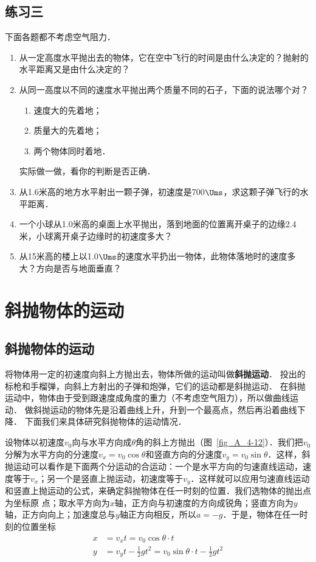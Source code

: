 \subsection*{练习三}


下面各题都不考虑空气阻力．
\begin{enumerate}
\item 从一定高度水平抛出去的物体，它在空中飞行的时间是由什么决定的？抛射的水平距离又是由什么决定的？
\item 从同一高度以不同的速度水平抛出两个质量不同的石子，下面的说法哪个对？
\begin{enumerate}
	\item 速度大的先着地；
	\item  质量大的先着地；
	\item 两个物体同时着地．
\end{enumerate}
实际做一做，看你的判断是否正确．

\item 从1.6米高的地方水平射出一颗子弹，初速度是700$\Ums$，求这颗子弹飞行的水平距离．
\item 一个小球从1.0米高的桌面上水平抛出，落到地面的位置离开桌子的边缘2.4米，小球离开桌子边缘时的初速度多大？
\item 从15米高的楼上以1.0$\Ums$的速度水平扔出一物体，此物体落地时的速度多大？方向是否与地面垂直？

\end{enumerate}


\section{斜抛物体的运动}
\subsection{斜抛物体的运动} 

将物体用一定的初速度向斜上方抛出去，物体所做的运动叫做\textbf{斜抛运动}．
投出的标枪和手榴弹，向斜上方射出的子弹和炮弹，它们的运动都是斜抛运动．
在斜抛运动中，物体由于受到跟速度成角度的重力（不考虑空气阻力），所以做曲线运动．
做斜抛运动的物体先是沿着曲线上升，升到一个最高点，然后再沿着曲线下降．
下面我们来具体研究斜抛物体的运动情况．

设物体以初速度$v_0$向与水平方向成$\theta$角的斜上方抛出（图~\ref{fig_A_4-12}）．我们把$v_0$分解为水平方向的分速度$v_x=v_0\cos\theta$和竖直方向的分速度$v_y=v_0\sin\theta$．这样，斜抛运动可以看作是下面两个分运动的合运动：一个是水平方向的匀速直线运动，速度等于$v_x$；另一个是竖直上抛运动，初速度等于$v_y$．这样就可以应用匀速直线运动和竖直上抛运动的公式，来确定斜抛物体在任一时刻的位置．我们选物体的抛出点为坐标原
点；取水平方向为$x$轴，正方向与初速度的方向成锐角；竖直方向为$y$轴，正方向向上；加速度总与$y$轴正方向相反，所以$a=-g$．于是，物体在任一时刻的位置坐标
\[\begin{split}
x&=v_x t=v_0\cos\theta \cdot t\\
y&=v_y t-\frac{1}{2}gt^2=v_0\sin\theta \cdot t-\frac{1}{2}gt^2
\end{split} \]

